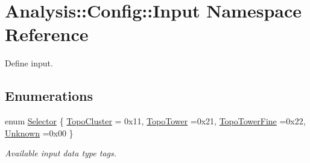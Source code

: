 \hypertarget{namespaceAnalysis_1_1Config_1_1Input}{}\section{Analysis\+:\+:Config\+:\+:Input Namespace Reference}
\label{namespaceAnalysis_1_1Config_1_1Input}


Define input.  


\subsection*{Enumerations}
\begin{DoxyCompactItemize}
\item 
enum \hyperlink{namespaceAnalysis_1_1Config_1_1Input_a4fbe1ba2d37856e6b9784b4999d5268a}{Selector} \{ \hyperlink{namespaceAnalysis_1_1Config_1_1Input_a4fbe1ba2d37856e6b9784b4999d5268aa314665a30d375cd30c58b262159a7742}{Topo\+Cluster} = 0x11, 
\hyperlink{namespaceAnalysis_1_1Config_1_1Input_a4fbe1ba2d37856e6b9784b4999d5268aaed118233c2f6356936e24cc848d97b64}{Topo\+Tower} =0x21, 
\hyperlink{namespaceAnalysis_1_1Config_1_1Input_a4fbe1ba2d37856e6b9784b4999d5268aa2180f436367feb0818a05ef720ff19a2}{Topo\+Tower\+Fine} =0x22, 
\hyperlink{namespaceAnalysis_1_1Config_1_1Input_a4fbe1ba2d37856e6b9784b4999d5268aa18e62acb2e8539c61f5a9a2cd005cd52}{Unknown} =0x00
 \}\begin{DoxyCompactList}\small\item\em Available input data type tags. \end{DoxyCompactList}
\end{DoxyCompactItemize}
